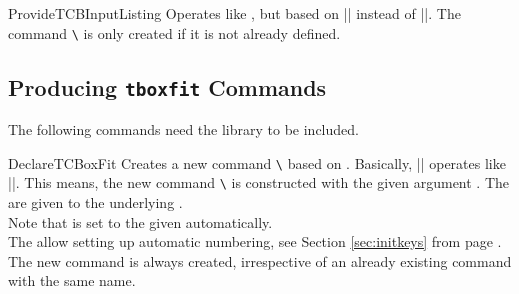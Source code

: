 \begin{docCommand}{ProvideTCBInputListing}{}
  Operates like , but based on |\ProvideDocumentCommand| instead of |\DeclareDocumentCommand|.
  The command \texttt{\textbackslash} is only created if it is not already defined.
\end{docCommand}


\clearpage
\subsection{Producing \texttt{tboxfit} Commands}\label{subsec:xparse_tcboxfit}
\begin{marker}
The following commands need the  library to be included.
\end{marker}

\begin{docCommand}{DeclareTCBoxFit}{}
  Creates a new command \texttt{\textbackslash} based on .
  Basically, |\DeclareTCBoxFit| operates like |\DeclareDocumentCommand|. This means,
  the new command \texttt{\textbackslash} is constructed with the given argument .
  The  are given to the underlying .\\
  Note that  is set to the given 
  automatically.\\
  The  allow setting up automatic numbering,
  see Section \ref{sec:initkeys} from page \pageref{sec:initkeys}.\\
  The new command is always created, irrespective of an already existing
  command with the same name.

\end{docCommand}


